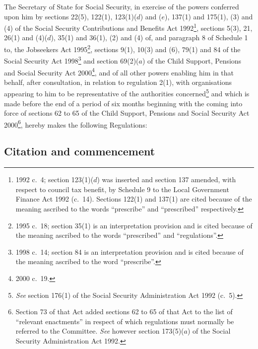 \documentclass[12pt,a4paper]{article}
\title{\regstitle}
\author{S.I.\ 2001 No.\ 1711}
\date{Made
3rd May 2001\\
Laid before Parliament
8th May 2001\\
Coming into force
15th October 2001
}
\begin{document}
\maketitle

\noindent
The Secretary of State for Social Security, in exercise of the powers conferred upon him by sections 22(5), 122(1), 123(1)($d$)  and ($e$), 137(1) and 175(1), (3) and (4) of the Social Security Contributions and Benefits Act 1992\footnote{1992 c.\ 4; section 123(1)($d$) was inserted and section 137 amended, with respect to council tax benefit, by Schedule 9 to the Local Government Finance Act 1992 (c.\ 14). Sections 122(1) and 137(1) are cited because of the meaning ascribed to the words “prescribe” and “prescribed” respectively.}, sections 5(3), 21, 26(1) and (4)($d$), 35(1) and 36(1), (2) and (4) of, and paragraph 8 of Schedule 1 to, the Jobseekers Act 1995\footnote{1995 c.\ 18; section 35(1) is an interpretation provision and is cited because of the meaning ascribed to the words “prescribed” and “regulations”.}, sections 9(1), 10(3) and (6), 79(1) and 84 of the Social Security Act 1998\footnote{1998 c.\ 14; section 84 is an interpretation provision and is cited because of the meaning ascribed to the word “prescribe”.} and section 69(2)($a$)  of the Child Support, Pensions and Social Security Act 2000\footnote{2000 c.\ 19.}, and of all other powers enabling him in that behalf, after consultation, in relation to regulation 2(1), with organisations appearing to him to be representative of the authorities concerned\footnote{\emph{See} section 176(1) of the Social Security Administration Act 1992 (c.\ 5).} and which is made before the end of a period of six months beginning with the coming into force of sections 62 to 65 of the Child Support, Pensions and Social Security Act 2000\footnote{Section 73 of that Act added sections 62 to 65 of that Act to the list of “relevant enactments” in respect of which regulations must normally be referred to the Committee. \emph{See} however section 173(5)($a$) of the Social Security Administration Act 1992.}, hereby makes the following Regulations: 

{\sloppy

\tableofcontents

}

\bigskip

\setcounter{secnumdepth}{-2}

\subsection[1. Citation and commencement]{Citation and commencement}
\end{document}
